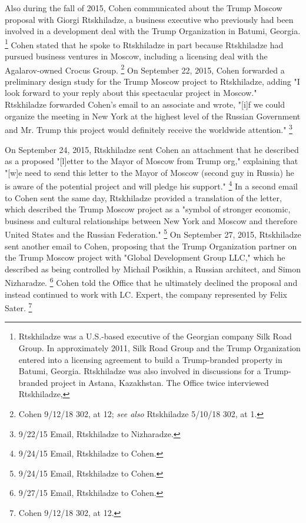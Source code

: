 Also during the fall of 2015, Cohen communicated about the Trump Moscow proposal with Giorgi Rtskhiladze, a business executive who previously had been involved in a development deal with the Trump Organization in Batumi, Georgia.%
\footnote{Rtskhiladze was a U.S.-based executive of the Georgian company Silk Road Group.
In approximately 2011, Silk Road Group and the Trump Organization entered into a licensing agreement to build a Trump-branded property in Batumi, Georgia.
Rtskhiladze was also involved in discussions for a Trump-branded project in Astana, Kazakhstan.
The Office twice interviewed Rtskhiladze, }
Cohen stated that he spoke to Rtskhiladze in part because Rtskhiladze had pursued business ventures in Moscow, including a licensing deal with the Agalarov-owned Crocus Group.%
\footnote{Cohen 9/12/18 302, at 12;
\textit{see also} Rtskhiladze 5/10/18 302, at 1.}
On September 22, 2015, Cohen forwarded a preliminary design study for the Trump Moscow project to Rtskhiladze, adding "I look forward to your reply about this spectacular project in Moscow."
Rtskhiladze forwarded Cohen's email to an associate and wrote, "[i]f we could organize the meeting in New York at the highest level of the Russian Government and Mr. Trump this project would definitely receive the worldwide attention."%
\footnote{9/22/15 Email, Rtskhiladze to Nizharadze.}

On September 24, 2015, Rtskhiladze sent Cohen an attachment that he described as a proposed "[l]etter to the Mayor of Moscow from Trump org," explaining that "[w]e need to send this letter to the Mayor of Moscow (second guy in Russia) he is aware of the potential project and will pledge his support."%
\footnote{9/24/15 Email, Rtskhiladze to Cohen.}
In a second email to Cohen sent the same day, Rtskhiladze provided a translation of the letter, which described the Trump Moscow project as a "symbol of stronger economic, business and cultural relationships between New York and Moscow and therefore United States and the Russian Federation."%
\footnote{9/24/15 Email, Rtskhiladze to Cohen.}
On September 27, 2015, Rtskhiladze sent another email to Cohen, proposing that the Trump Organization partner on the Trump Moscow project with "Global Development Group LLC," which he described as being controlled by Michail Posikhin, a Russian architect, and Simon Nizharadze.%
\footnote{9/27/15 Email, Rtskhiladze to Cohen.}
Cohen told the Office that he ultimately declined the proposal and instead continued to work with LC. Expert, the company represented by Felix Sater.%
\footnote{Cohen 9/12/18 302, at 12.}

